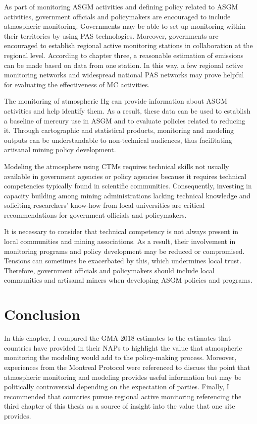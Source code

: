 As part of monitoring ASGM activities and defining policy related to ASGM activities, government officials and policymakers are encouraged to include atmospheric monitoring.  Governments may be able to set up monitoring within their territories by using PAS technologies. Moreover, governments are encouraged to establish regional active monitoring stations in collaboration at the regional level. According to chapter three, a reasonable estimation of emissions can be made based on data from one station. In this way, a few regional active monitoring networks and widespread national PAS networks may prove helpful for evaluating the effectiveness of MC activities.
  
The monitoring of atmospheric Hg can provide information about ASGM activities and help identify them. As a result, these data can be used to establish a baseline of mercury use in ASGM and to evaluate policies related to reducing it. Through cartographic and statistical products, monitoring and modeling outputs can be understandable to non-technical audiences, thus facilitating artisanal mining policy development. 

Modeling the atmosphere using CTMs requires technical skills not usually available in government agencies or policy agencies because it requires technical competencies typically found in scientific communities. Consequently, investing in capacity building among mining administrations lacking technical knowledge and soliciting researchers' know-how from local universities are critical recommendations for government officials and policymakers.  
 
It is necessary to consider that technical competency is not always present in local communities and mining associations. As a result, their involvement in monitoring programs and policy development may be reduced or compromised. Tensions can sometimes be exacerbated by this, which undermines local trust. Therefore, government officials and policymakers should include local communities and artisanal miners when developing ASGM policies and programs. 


\section{Conclusion}
\begin{flushleft}
In this chapter, I compared the GMA 2018 estimates to the estimates that countries have provided in their NAPs to highlight the value that atmospheric monitoring the modeling would add to the policy-making process. Moreover, experiences from the Montreal Protocol were referenced to discuss the point that atmospheric monitoring and modeling provides useful information but may be politically controversial depending on the expectation of parties. Finally, I recommended that countries pursue regional active monitoring  referencing the third chapter of this thesis as a source of insight into the value that one site provides. 
\end{flushleft}